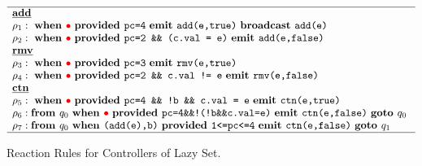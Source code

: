 \begin{figure}
  {\footnotesize
    \[
\begin{array}{l}
\hline
{\mbox{\underline{\textbf{add}}}}  \\
\rho_1 : \mbox{ \bf when }\textcolor{red}{\bullet}\mbox{ \bf provided }\mbox{\tt pc=4}\mbox{ \bf emit }\mbox{\tt add(e,true)}\mbox{ \bf broadcast } \mbox{\tt add(e)}\\
\rho_2 :   \mbox{ \bf when }\textcolor{red}{\bullet}\mbox{ \bf provided }\mbox{\tt pc=2 \&\& (c.val = e)}\mbox{ \bf emit }\mbox{\tt add(e,false)}\ \\
 {\mbox{\underline{\textbf{rmv}}}} \\
\rho_3 :   \mbox{ \bf when }\textcolor{red}{\bullet}\mbox{ \bf provided }\mbox{\tt pc=3}\mbox{ \bf emit }\mbox{\tt rmv(e,true)}\ \\
\rho_4 :   \mbox{ \bf when }\textcolor{red}{\bullet}\mbox{ \bf provided }\mbox{\tt pc=2 \&\& c.val != e}\mbox{ \bf emit }\mbox{\tt rmv(e,false)}\ \\
 {\mbox{\underline{\textbf{ctn}}}} \\
\rho_5: \mbox{ \bf when }\textcolor{red}{\bullet}\mbox{ \bf provided }\mbox{\tt pc=4 \&\& !b \&\& c.val = e}\mbox{ \bf emit }\mbox{\tt ctn(e,true)}\ \\
\rho_6:    \mbox{\bf from } {q}_0 \mbox{ \bf when }\textcolor{red}{\bullet}\mbox{ \bf provided }\mbox{\tt pc=4\&\&!(!b\&\&c.val=e)}\mbox{ \bf emit }\mbox{\tt ctn(e,false)}\mbox{ \bf goto } {q}_0\ \\
\rho_7 :  \mbox{\bf from } {q}_0 \mbox{ \bf when }\mbox{\tt (add(e),b)}\mbox{ \bf provided }\mbox{\tt 1<=pc<=4}\mbox{ \bf emit }\mbox{\tt ctn(e,false)} \mbox{ \bf goto } {q}_1\ \\
\hline  
\end{array}
\]
  }
  \vspace*{-0.5cm}
  \caption{Reaction Rules for Controllers of Lazy Set.}
  \label{rrules:lazy:list:fig}
\end{figure}
